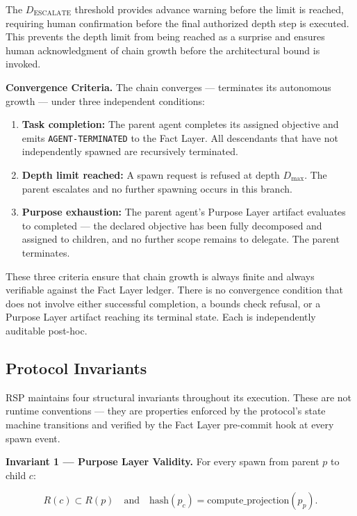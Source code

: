 The $D_{\text{ESCALATE}}$ threshold provides advance warning before the limit is reached, requiring human confirmation before the final authorized depth step is executed. This prevents the depth limit from being reached as a surprise and ensures human acknowledgment of chain growth before the architectural bound is invoked.

\bigskip
\noindent\textbf{Convergence Criteria.} The chain converges — terminates its autonomous growth — under three independent conditions:

\begin{enumerate}
  \item[(CC-1)] \textbf{Task completion:} The parent agent completes its assigned objective and emits \texttt{AGENT-TERMINATED} to the Fact Layer. All descendants that have not independently spawned are recursively terminated.
  \item[(CC-2)] \textbf{Depth limit reached:} A spawn request is refused at depth $D_{\max}$. The parent escalates and no further spawning occurs in this branch.
  \item[(CC-3)] \textbf{Purpose exhaustion:} The parent agent's Purpose Layer artifact evaluates to completed — the declared objective has been fully decomposed and assigned to children, and no further scope remains to delegate. The parent terminates.
\end{enumerate}

These three criteria ensure that chain growth is always finite and always verifiable against the Fact Layer ledger. There is no convergence condition that does not involve either successful completion, a bounds check refusal, or a Purpose Layer artifact reaching its terminal state. Each is independently auditable post-hoc.

\subsection{Protocol Invariants}

RSP maintains four structural invariants throughout its execution. These are not runtime conventions — they are properties enforced by the protocol's state machine transitions and verified by the Fact Layer pre-commit hook at every spawn event.

\bigskip
\noindent\textbf{Invariant 1 — Purpose Layer Validity.} For every spawn from parent $p$ to child $c$:

\begin{equation}
R(c) \subset R(p)\quad \text{and} \quad \mathrm{hash}(p_c) = \mathrm{compute\_projection}(p_p).
\label{eq:rs-inv-purpose-validity}
\end{equation}

